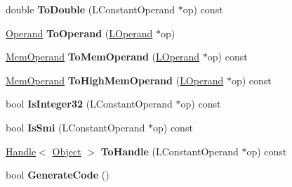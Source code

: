 \begin{DoxyCompactItemize}
\item 
double {\bfseries To\+Double} (L\+Constant\+Operand $\ast$op) const \hypertarget{classv8_1_1internal_1_1_l_code_gen_a9859cf602181324ec10970ab93416aaa}{}\label{classv8_1_1internal_1_1_l_code_gen_a9859cf602181324ec10970ab93416aaa}

\item 
\hyperlink{classv8_1_1internal_1_1_operand}{Operand} {\bfseries To\+Operand} (\hyperlink{classv8_1_1internal_1_1_l_operand}{L\+Operand} $\ast$op)\hypertarget{classv8_1_1internal_1_1_l_code_gen_aadfda9a2906fe2eea56eb9e3c2a4c054}{}\label{classv8_1_1internal_1_1_l_code_gen_aadfda9a2906fe2eea56eb9e3c2a4c054}

\item 
\hyperlink{classv8_1_1internal_1_1_mem_operand}{Mem\+Operand} {\bfseries To\+Mem\+Operand} (\hyperlink{classv8_1_1internal_1_1_l_operand}{L\+Operand} $\ast$op) const \hypertarget{classv8_1_1internal_1_1_l_code_gen_a3d306507f84e3e1d29c05a22d0c43248}{}\label{classv8_1_1internal_1_1_l_code_gen_a3d306507f84e3e1d29c05a22d0c43248}

\item 
\hyperlink{classv8_1_1internal_1_1_mem_operand}{Mem\+Operand} {\bfseries To\+High\+Mem\+Operand} (\hyperlink{classv8_1_1internal_1_1_l_operand}{L\+Operand} $\ast$op) const \hypertarget{classv8_1_1internal_1_1_l_code_gen_a9a04775e17692d63225c82752d5120f7}{}\label{classv8_1_1internal_1_1_l_code_gen_a9a04775e17692d63225c82752d5120f7}

\item 
bool {\bfseries Is\+Integer32} (L\+Constant\+Operand $\ast$op) const \hypertarget{classv8_1_1internal_1_1_l_code_gen_a2d621118ecad14881a0c90e0989b31e0}{}\label{classv8_1_1internal_1_1_l_code_gen_a2d621118ecad14881a0c90e0989b31e0}

\item 
bool {\bfseries Is\+Smi} (L\+Constant\+Operand $\ast$op) const \hypertarget{classv8_1_1internal_1_1_l_code_gen_ae0339cb277e927ff5d2073eb7790018a}{}\label{classv8_1_1internal_1_1_l_code_gen_ae0339cb277e927ff5d2073eb7790018a}

\item 
\hyperlink{classv8_1_1internal_1_1_handle}{Handle}$<$ \hyperlink{classv8_1_1internal_1_1_object}{Object} $>$ {\bfseries To\+Handle} (L\+Constant\+Operand $\ast$op) const \hypertarget{classv8_1_1internal_1_1_l_code_gen_a374248376713e39975fdc389c121d3b8}{}\label{classv8_1_1internal_1_1_l_code_gen_a374248376713e39975fdc389c121d3b8}

\item 
bool {\bfseries Generate\+Code} ()\hypertarget{classv8_1_1internal_1_1_l_code_gen_aa1307599a440d099f0dbb5dc24f4f59c}{}\label{classv8_1_1internal_1_1_l_code_gen_aa1307599a440d099f0dbb5dc24f4f59c}


\end{DoxyCompactItemize}
